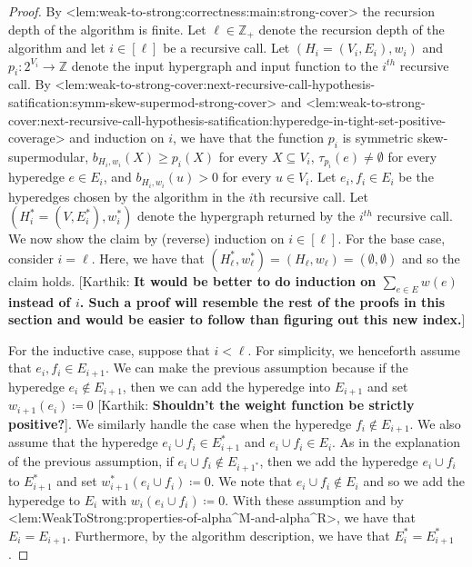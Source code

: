\documentclass{article}
\def\Cref#1{<#1>}%
\newcommand{\knote}[1]{{\color{red}[{\tiny Karthik: \bf #1}]\marginpar{\color{red}*}}}
\providecommand{\Z}{\mathbb{Z}}
\begin{document}
\iffalse
\begin{proof}
    By \Cref{lem:weak-to-strong:correctness:main:strong-cover} the recursion depth of the algorithm is finite. Let $\ell \in \Z_+$ denote the recursion depth of the algorithm and let $i \in [\ell]$ be a recursive call. Let $(H_i = (V_i, E_i), w_i)$ and $p_i:2^{V_i}\rightarrow\Z$ denote the input hypergraph and input function to the $i^{th}$ recursive call. By \Cref{lem:weak-to-strong-cover:next-recursive-call-hypothesis-satification:symm-skew-supermod-strong-cover} and \Cref{lem:weak-to-strong-cover:next-recursive-call-hypothesis-satification:hyperedge-in-tight-set-positive-coverage} and induction on $i$, we have that the function $p_i$ is symmetric skew-supermodular, $b_{H_i, w_i}(X) \geq p_i(X)$ for every $X \subseteq V_i$, $\tau_{p_i}(e)\neq \emptyset$ for every hyperedge $e\in E_i$, and $b_{H_i, w_i}(u) > 0$ for every $u \in V_i$. Let $e_i, f_i\in E_i$ be the hyperedges chosen by the algorithm in the $i$th recursive call. Let $(H_i^*=(V, E_i^*), w_i^*)$ denote the hypergraph returned by the $i^{th}$ recursive call. We now show the claim by (reverse) induction on $i \in [\ell]$. For the base case, consider $i = \ell$. Here, we have that $(H_\ell^*, w_\ell^*) = (H_\ell, w_\ell) = (\emptyset, \emptyset)$ and so the claim holds. \knote{It would be better to do induction on  $\sum_{e\in E}w(e)$ instead of $i$. Such a proof will resemble the rest of the proofs in this section and would be easier to follow than figuring out this new index.} 
    
    For the inductive case, suppose that $i < \ell$.
    For simplicity, we henceforth assume that  $e_i, f_i \in E_{i+1}$. We can make the previous assumption because if the hyperedge $e_i \not \in E_{i+1}$, then we can add the hyperedge into $E_{i+1}$ and set $w_{i+1}(e_i) \coloneqq  0$ \knote{Shouldn't the weight function be strictly positive?}. We similarly handle the case when the hyperedge $f_i \not \in E_{i+1}$. We also assume that the hyperedge $e_{i} \cup f_i \in E_{i+1}^*$ and $e_{i} \cup f_i \in E_{i}$. As in the explanation of the previous assumption, if $e_i\cup f_i \not \in E_{i+1^*}$, then we add the hyperedge $e_i \cup f_i$ to $E^*_{i+1}$ and set $w^*_{i+1}(e_i\cup f_i) \coloneqq  0$. We note that $e_{i}\cup f_i \not \in E_i$ and so we add the hyperedge to $E_i$ with $w_i(e_i\cup f_i) \coloneqq  0$. With these assumption and by \Cref{lem:WeakToStrong:properties-of-alpha^M-and-alpha^R}, we have that $E_i = E_{i+1}$. Furthermore, by the algorithm description, we have that  $E_{i}^* = E_{i+1}^*$.


\end{proof}
\end{document}
